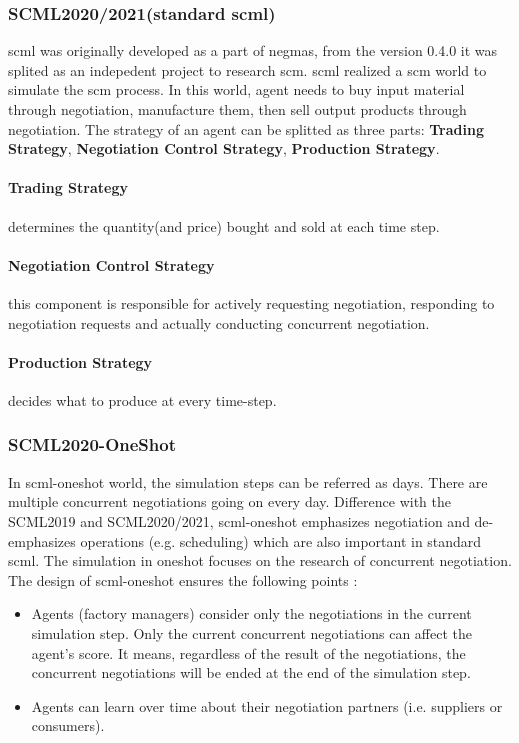 \subsubsection{SCML2020/2021(standard scml)} \label{background:scml2020}
\gls{scml} was originally developed as a part of \gls{negmas}, from the version 0.4.0 it was splited as an indepedent project to research \gls{scm}. \gls{scml} realized a \gls{scm} world to simulate the \gls{scm} process. In this world, agent needs to buy input material through negotiation, manufacture them, then sell output products through negotiation\parencite{Mohammad2021}. The strategy of an agent can be splitted as three parts: \textbf{Trading Strategy}, \textbf{Negotiation Control Strategy}, \textbf{Production Strategy}.

\paragraph{Trading Strategy} determines the quantity(and price) bought and sold at each time step.
\paragraph{Negotiation Control Strategy} this component is responsible for actively requesting negotiation, responding to negotiation requests and actually conducting concurrent negotiation.
\paragraph{Production Strategy} decides what to produce at every time-step.

\subsubsection{SCML2020-OneShot} \label{background:scml2020-oneshot}
In \gls{scml-oneshot} world, the simulation steps can be referred as days. There are multiple concurrent negotiations going on every day. Difference with the SCML2019 and SCML2020/2021, \gls{scml-oneshot} emphasizes negotiation and de-emphasizes operations (e.g. scheduling) which are also important in standard scml. The simulation in oneshot focuses on the research of concurrent negotiation. The design of \gls{scml-oneshot} ensures the following points \parencite{Mohammad2021}:

\begin{itemize}
	\item Agents (factory managers) consider only the negotiations in the current simulation step. Only the current concurrent negotiations can affect the agent's score. It means, regardless of the result of the negotiations, the concurrent negotiations will be ended at the end of the simulation step. 
	\item Agents can learn over time about their negotiation partners (i.e. suppliers or consumers).
\end{itemize} 

